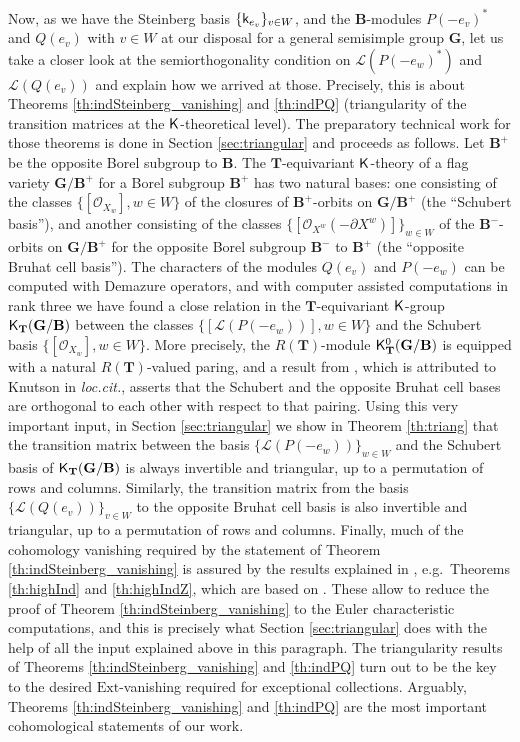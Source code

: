\documentclass[sn-mathphys-num]{sn-jnl}%
\newcommand{\Oo}{\mathcal O}
\newcommand{\Ll}{\mathcal L}
\newcommand{\Ext}{{\mathrm{Ext}}}
\newcommand{\sk}{{\sf k}}
\newcommand{\sK}{{\sf K}}
\newcommand{\bg}{\mathbf G}
\newcommand{\fb}{\mathbf B}
\newcommand{\bt}{\mathbf T}
\newcommand{\fX}{{ X}}
\theoremstyle{definition}
\begin{document}
Now, as we have the Steinberg basis $\{\sk_{e_v}\}_{v\in W}$, and the 
$\fb$-modules $P(-e_v)^*$ and $Q(e_v)$ with $v\in W$ at our disposal for a general semisimple group $\bg$, let us take a closer look at the semiorthogonality condition on $\Ll (P(-e_w)^*)$ and $\Ll (Q(e_v))$ and explain how we arrived at those. Precisely, this is about Theorems \ref{th:indSteinberg_vanishing} and \ref{th:indPQ} (triangularity of the transition matrices at the $\sf K$-theoretical level). 
The preparatory technical work for those theorems is done in Section \ref{sec:triangular} and proceeds as follows. Let $\fb^+$ be the opposite Borel subgroup to $\fb$. The $\bt$-equivariant $\sf K$-theory of a flag variety $\bg/\fb^+$ for a Borel subgroup $\fb^+$
has two natural bases: one consisting of the classes $\{[\Oo _{X_w}],w\in W\}$ of the closures of $\fb^+$-orbits on $\bg/\fb^+$  (the ``Schubert basis''), and another consisting of the classes 
$\{[\Oo_{\fX^w}(-\partial \fX^w)]\}_{w\in W}$ of the $\fb ^{-}$-orbits on $\bg/\fb^+$ for the opposite Borel subgroup $\fb ^{-}$ to $\fb^+$ (the ``opposite Bruhat cell basis''). The characters of the modules $Q(e_v)$ and $P(-e_w)$ can be computed with Demazure operators, and with computer assisted computations in rank three we have found a close relation in the $ \bt$-equivariant $\sK$-group $\sK_{ \bt}( \bg/ \fb)$ between the classes $\{[\Ll(P(-e_w))], w\in W\}$ and the Schubert basis $\{[\Oo _{X_w}],w\in W\}$. More precisely, the $R(\bt)$-module ${\sf K}^0_{\bt}(\bg/\fb)$ is equipped with a natural $R(\bt)$-valued paring, and a result from \cite{GrahamKumar}, which is attributed to Knutson in {\it loc.cit.}, asserts that the Schubert and the opposite Bruhat cell bases are orthogonal to each other with respect to that pairing. Using this very important input, in Section \ref{sec:triangular} we show in Theorem \ref{th:triang} that the transition matrix between the basis $\{\Ll(P(-e_w))\}_{w\in W}$ and the Schubert basis of $\sK_{ \bt}( \bg/ \fb)$ is always invertible and triangular, up to a permutation of rows and columns. Similarly, the transition matrix from the basis $\{\Ll(Q(e_v))\}_{v\in W}$ to the opposite Bruhat cell basis is also invertible and triangular, up to a permutation of rows and columns. Finally, much of the cohomology vanishing required by the statement of Theorem \ref{th:indSteinberg_vanishing} is assured by the results explained in \cite{WvdKTata}, e.g.\ Theorems \ref{th:highInd} and \ref{th:highIndZ}, which are based on \cite{MathG}. These allow to reduce the proof of Theorem \ref{th:indSteinberg_vanishing} to the Euler characteristic computations, and this is precisely what Section \ref{sec:triangular} does with the help of all the input explained above in this paragraph. The triangularity results of Theorems \ref{th:indSteinberg_vanishing} and \ref{th:indPQ} turn out to be the key to the desired $\Ext$-vanishing required for exceptional collections. Arguably,  Theorems \ref{th:indSteinberg_vanishing} and \ref{th:indPQ} are the most important cohomological statements of our work.
\end{document}

